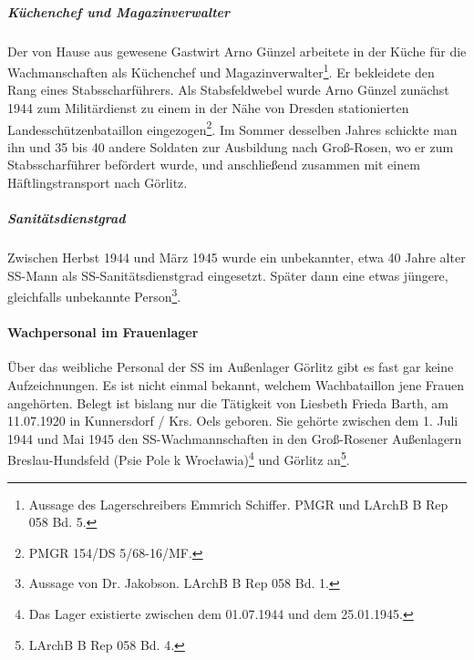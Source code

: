 \subparagraph{Küchenchef und Magazinverwalter}
Der von Hause aus gewesene Gastwirt Arno Günzel arbeitete in der Küche für die Wachmanschaften als Küchenchef und Magazinverwalter\footnote{Aussage des Lagerschreibers Emmrich Schiffer. PMGR und LArchB B Rep 058 Bd. 5.}. Er bekleidete den Rang eines Stabsscharführers.
Als Stabsfeldwebel wurde Arno Günzel zunächst 1944 zum Militärdienst zu einem in der Nähe von Dresden stationierten Landesschützenbataillon eingezogen\footnote{PMGR 154/DS 5/68-16/MF.}. Im Sommer desselben Jahres schickte man ihn und 35 bis 40 andere Soldaten zur Ausbildung nach Groß-Rosen, wo er zum Stabsscharführer befördert wurde, und anschließend zusammen mit einem Häftlingstransport nach Görlitz.


\subparagraph{Sanitätsdienstgrad}
Zwischen Herbst 1944 und März 1945 wurde ein unbekannter, etwa 40 Jahre alter SS-Mann als SS-Sanitätsdienstgrad eingesetzt. Später dann eine etwas jüngere, gleichfalls unbekannte Person\footnote{Aussage von Dr. Jakobson. LArchB B Rep 058 Bd. 1.}.

\paragraph{Wachpersonal im Frauenlager}
Über das weibliche Personal der SS im Außenlager Görlitz gibt es fast gar keine Aufzeichnungen. Es ist nicht einmal bekannt, welchem Wachbataillon jene Frauen angehörten. Belegt ist bislang nur die Tätigkeit von Liesbeth Frieda Barth, am 11.07.1920 in Kunnersdorf / Krs. Oels geboren. Sie gehörte zwischen dem 1. Juli 1944 und Mai 1945 den SS-Wachmannschaften in den Groß-Rosener Außenlagern Breslau-Hundsfeld (Psie Pole k Wroc\l awia)\footnote{Das Lager existierte zwischen dem 01.07.1944 und dem 25.01.1945.} und Görlitz an\footnote{LArchB B Rep 058 Bd. 4.}.

